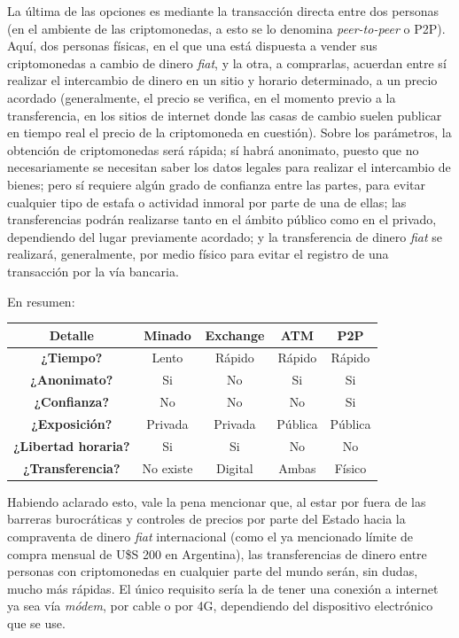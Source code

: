 \documentclass[12pt,a4paper,twoside]{book}
\begin{document}
La última de las opciones es mediante la transacción directa entre dos personas (en el ambiente de las criptomonedas, a esto se lo denomina \textit{peer-to-peer} o P2P). Aquí, dos personas físicas, en el que una está dispuesta a vender sus criptomonedas a cambio de dinero \textit{fiat}, y la otra, a comprarlas, acuerdan entre sí realizar el intercambio de dinero en un sitio y horario determinado, a un precio acordado (generalmente, el precio se verifica, en el momento previo a la transferencia, en los sitios de internet donde las casas de cambio suelen publicar en tiempo real el precio de la criptomoneda en cuestión). Sobre los parámetros, la obtención de criptomonedas será rápida; sí habrá anonimato, puesto que no necesariamente se necesitan saber los datos legales para realizar el intercambio de bienes; pero sí requiere algún grado de confianza entre las partes, para evitar cualquier tipo de estafa o actividad inmoral por parte de una de ellas; las transferencias podrán realizarse tanto en el ámbito público como en el privado, dependiendo del lugar previamente acordado; y la transferencia de dinero \textit{fiat} se realizará, generalmente, por medio físico para evitar el registro de una transacción por la vía bancaria.

En resumen:

\begin{center}
\begin{tabular}{|c|c|c|c|c|}
\hline 
\textbf{Detalle} & \textbf{Minado} & \textbf{Exchange} & \textbf{ATM} & \textbf{P2P} \\ 
\hline 
\textbf{¿Tiempo?} & Lento & Rápido & Rápido & Rápido \\ 
\hline 
\textbf{¿Anonimato?} & Si & No & Si & Si \\ 
\hline 
\textbf{¿Confianza?} & No & No & No & Si \\ 
\hline 
\textbf{¿Exposición?} & Privada & Privada & Pública & Pública \\ 
\hline 
\textbf{¿Libertad horaria?} & Si & Si & No & No \\ 
\hline 
\textbf{¿Transferencia?} & No existe & Digital & Ambas & Físico \\ 
\hline 
\end{tabular} 
\end{center}

Habiendo aclarado esto, vale la pena mencionar que, al estar por fuera de las barreras burocráticas y controles de precios por parte del Estado hacia la compraventa de dinero \textit{fiat} internacional (como el ya mencionado límite de compra mensual de U\$S 200 en Argentina), las transferencias de dinero entre personas con criptomonedas en cualquier parte del mundo serán, sin dudas, mucho más rápidas. El único requisito sería la de tener una conexión a internet ya sea vía \textit{módem}, por cable o por 4G, dependiendo del dispositivo electrónico que se use.
\end{document}
